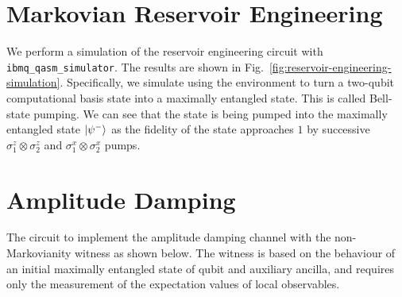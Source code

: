 \documentclass[12pt]{article}
\DeclarePairedDelimiter{\ket}{\lvert}{\rangle}
\begin{document}
  \section{Markovian Reservoir Engineering}
  We perform a simulation of the reservoir engineering circuit with \texttt{ibmq\_qasm\_simulator}. The results are shown in Fig.~\ref{fig:reservoir-engineering-simulation}. Specifically, we simulate using the environment to turn a two-qubit computational basis state into a maximally entangled state. This is called Bell-state pumping. We can see that the state is being pumped into the maximally entangled state \( \ket{\psi^{-}} \) as the fidelity of the state approaches \( 1 \) by successive \( \sigma^{z}_{1} \otimes \sigma^{z}_{2} \) and \( \sigma^{x}_{1} \otimes \sigma^{x}_{2} \) pumps.

  \section{Amplitude Damping}
  The circuit to implement the amplitude damping channel with the non-Markovianity witness as shown below. The witness is based on the behaviour of an initial maximally entangled state of qubit and auxiliary ancilla, and requires only the measurement of the expectation values of local observables.
\end{document}
